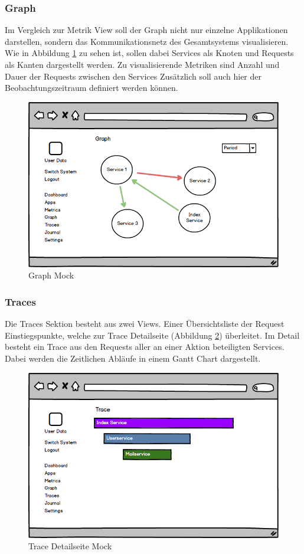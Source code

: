 \subsubsection{Graph}

Im Vergleich zur Metrik View soll der Graph nicht nur einzelne Applikationen darstellen,
sondern das Kommunikationsnetz des Gesamtsystems visualisieren.
Wie in Abbildung \ref{fig:graph} zu sehen ist, sollen dabei Services als Knoten und Requests als Kanten dargestellt werden.
Zu visualisierende Metriken sind Anzahl und Dauer der Requests zwischen den Services
Zusätzlich soll auch hier der Beobachtungszeitraum definiert werden können.

\begin{figure}[h]
 \centering
 \includegraphics[width=0.6\linewidth]{kapitel1/mocks/graph.png}
 \caption{Graph Mock}
 \label{fig:graph}
\end{figure}

\subsubsection{Traces}

Die Traces Sektion besteht aus zwei Views. Einer Übersichtsliste der Request Einstiegspunkte,
welche zur Trace Detailseite (Abbildung \ref{fig:trace}) überleitet. Im Detail besteht ein Trace aus den Requests
aller an einer Aktion beteiligten Services. Dabei werden die Zeitlichen Abläufe in einem Gantt Chart dargestellt.

\begin{figure}[h]
 \centering
 \includegraphics[width=0.6\linewidth]{kapitel1/mocks/trace.png}
 \caption{Trace Detailseite Mock}
 \label{fig:trace}
\end{figure}


